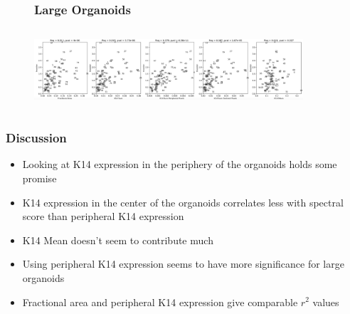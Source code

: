 \documentclass{beamer} %
\begin{document}
\begin{frame}
	\begin{figure}
		\frametitle{Large Organoids}
		\centering
		\includegraphics[width=10cm, height=3cm]{Image3}
	\end{figure}
\end{frame}

\begin{frame}
	\centering
\end{frame}

\begin{frame}
	\frametitle{Discussion}
	\begin{itemize}
			\item Looking at K14 expression in the periphery of the organoids holds some promise
			\item K14 expression in the center of the organoids correlates less with spectral score than peripheral K14 expression 
			\item K14 Mean doesn't seem to contribute much
			\item Using peripheral K14 expression seems to have more significance for large organoids 
			\item Fractional area and peripheral K14 expression give comparable $r^2$ values
	\end{itemize}
\end{frame}
\end{document}

